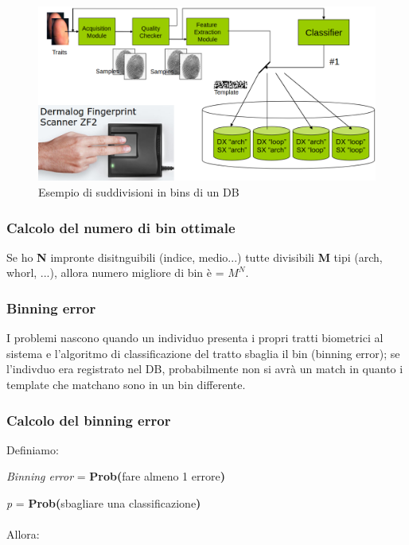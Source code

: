 \begin{figure}[ht]
    \centering
    \includegraphics[width=1\linewidth]{chapters/images-chap2/binning.png}
    \caption{Esempio di suddivisioni in bins di un DB}
\end{figure}

\subsubsection{Calcolo del numero di bin ottimale}

Se ho \textbf{N} impronte disitnguibili (indice, medio...) tutte divisibili \textbf{M} tipi (arch, whorl, ...), allora 
numero migliore di bin è = \textbf{$M^N$}.

\subsubsection{Binning error}

I  problemi nascono quando un individuo presenta i propri
tratti biometrici al sistema e l’algoritmo di classificazione
del tratto sbaglia il bin (binning error); se l'indivduo era registrato nel DB, probabilmente non si avrà un match in quanto i template che matchano sono in un bin differente.

\newpage

\subsubsection{Calcolo del binning error}

Definiamo:

\textit{Binning error} = \textbf{Prob(}fare almeno 1 errore\textbf{)}

\textit{p} = \textbf{Prob(}sbagliare una classificazione\textbf{)} \\\\
Allora:

